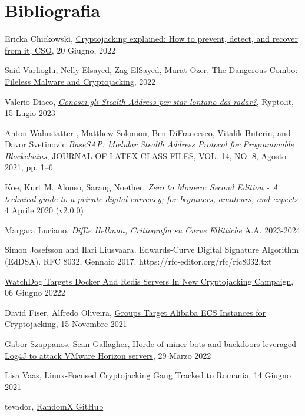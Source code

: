 \documentclass[12pt,a4paper]{article}
\begin{document}
\section{Bibliografia}
\begin{thebibliography}{9}

Ericka Chickowski, \href{https://arc.net/l/quote/karbftmg}{Cryptojacking
explained: How to prevent, detect, and recover from it, CSO}, 20 Giugno, 2022

Said Varlioglu, Nelly Elsayed, Zag ElSayed, Murat Ozer,
\href{https://arc.net/l/quote/kbarlqni}{The Dangerous Combo: Fileless Malware
and Cryptojacking}, 2022

Valerio Diaco, \href{https://arc.net/l/quote/qirrmtbh}{\textit{Conosci gli
Stealth Address per star lontano dai radar?}}, Rypto.it, 15 Lugio 2023

Anton Wahrstatter , Matthew Solomon, Ben DiFrancesco, Vitalik Buterin, and Davor
Svetinovic \textit{BaseSAP: Modular Stealth Address Protocol for Programmable
Blockchains}, JOURNAL OF LATEX CLASS FILES, VOL. 14, NO. 8, Agosto 2021, pp. 1–6

Koe, Kurt M. Alonso, Sarang Noether, \textit{Zero to Monero: Second Edition - A
technical guide to a private digital currency; for beginners, amateurs, and
experts} 4 Aprile 2020 (v2.0.0)

Margara Luciano, \textit{Diffie Hellman, Crittografia su Curve Ellittiche} A.A.
2023-2024

Simon Josefsson and Ilari Liusvaara. Edwards-Curve Digital Signature Algorithm
(EdDSA). RFC 8032, Gennaio 2017. https://rfc-editor.org/rfc/rfc8032.txt

\href{https://cyware.com/news/watchdog-targets-docker-and-redis-servers-in-new-cryptojacking-campaign-a5681a92}{WatchDog
Targets Docker And Redis Servers In New Cryptojacking Campaign}, 06 Giugno 20222

David Fiser, Alfredo Oliveira,
\href{https://www.trendmicro.com/en_us/research/21/k/groups-target-alibaba-ecs-instances-for-cryptojacking.html}{Groups
Target Alibaba ECS Instances for Cryptojacking}, 15 Novembre 2021

Gabor Szappanos, Sean Gallagher,
\href{https://news.sophos.com/en-us/2022/03/29/horde-of-miner-bots-and-backdoors-leveraged-log4j-to-attack-vmware-horizon-servers/}{Horde
of miner bots and backdoors leveraged Log4J to attack VMware Horizon servers},
29 Marzo 2022

Lisa Vaas,
\href{https://threatpost.com/linux-cryptojacking-gang-romania/167783/}{Linux-Focused
Cryptojacking Gang Tracked to Romania}, 14 Giugno 2021

tevador, \href{https://github.com/tevador/RandomX}{RandomX GitHub}

\end{thebibliography}
\end{document}
